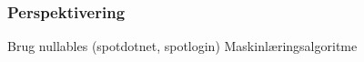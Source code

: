 \begin{frame}
	\frametitle{Perspektivering}

Brug nullables (spotdotnet, spotlogin)
Maskinlæringsalgoritme

\end{frame}